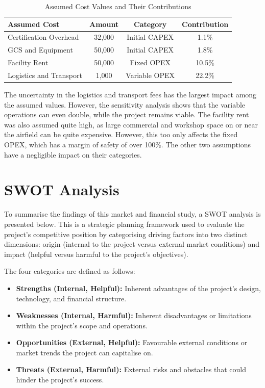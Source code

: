 \begin{table}[H]
    \centering
    \caption{Assumed Cost Values and Their Contributions}
    \label{tab:assumptions}
    \renewcommand{\arraystretch}{1.15}
    \begin{tabular}{|l|c|c|c|}
        \hline
        \textbf{Assumed Cost} & \textbf{Amount} & \textbf{Category} & \textbf{Contribution} \\
        \hline \hline
        Certification Overhead  & \texteuro{}32,000 & Initial CAPEX & 1.1\% \\
        \hline
        GCS and Equipment       & \texteuro{}50,000 & Initial CAPEX & 1.8\% \\
        \hline
        Facility Rent           & \texteuro{}50,000 & Fixed OPEX    & 10.5\% \\
        \hline
        Logistics and Transport & \texteuro{}1,000  & Variable OPEX & 22.2\% \\
        \hline
    \end{tabular}
\end{table}


The uncertainty in the logistics and transport fees has the largest impact among the assumed values. However, the sensitivity analysis shows that the variable operations can even double, while the project remains viable. The facility rent was also assumed quite high, as large commercial and workshop space on or near the airfield can be quite expensive. However, this too only affects the fixed OPEX, which has a margin of safety of over 100\%. The other two assumptions have a negligible impact on their categories.

\newpage
\section{SWOT Analysis}
\label{sec:swot_analysis}

To summarise the findings of this market and financial study, a SWOT analysis is presented below. This is a strategic planning framework used to evaluate the project's competitive position by categorising driving factors into two distinct dimensions: origin (internal to the project versus external market conditions) and impact (helpful versus harmful to the project's objectives). 

The four categories are defined as follows:
\begin{itemize}
    \item \textbf{Strengths (Internal, Helpful):} Inherent advantages of the project's design, technology, and financial structure.
    \item \textbf{Weaknesses (Internal, Harmful):} Inherent disadvantages or limitations within the project's scope and operations.
    \item \textbf{Opportunities (External, Helpful):} Favourable external conditions or market trends the project can capitalise on.
    \item \textbf{Threats (External, Harmful):} External risks and obstacles that could hinder the project's success.
\end{itemize}

